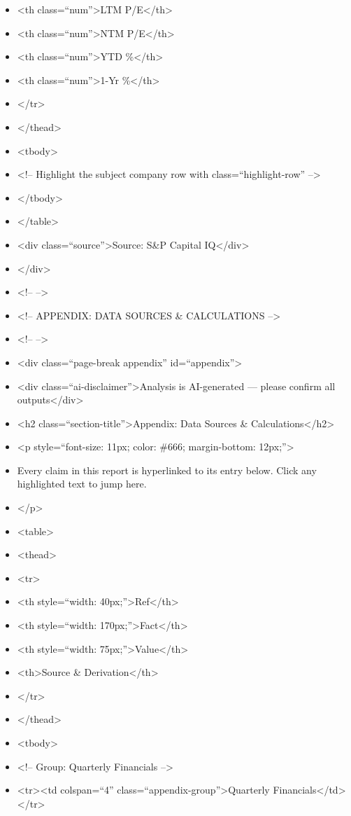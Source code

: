 \documentclass[11pt]{article}
\begin{document}
\begin{itemize}[leftmargin=*,itemsep=2pt,topsep=2pt]
\item {} <th class=``num''>LTM P/E</th>
\item {} <th class=``num''>NTM P/E</th>
\item {} <th class=``num''>YTD \%</th>
\item {} <th class=``num''>1-Yr \%</th>
\item {} </tr>
\item {} </thead>
\item {} <tbody>
\item {} <!-- Highlight the subject company row with class=``highlight-row'' -->
\item {} </tbody>
\item {} </table>
\item {} <div class=``source''>Source: S\&P Capital IQ</div>
\item {} </div>
\item {} <!-- -->
\item {} <!-- APPENDIX: DATA SOURCES \& CALCULATIONS -->
\item {} <!-- -->
\item {} <div class=``page-break appendix'' id=``appendix''>
\item {} <div class=``ai-disclaimer''>Analysis is AI-generated — please confirm all outputs</div>
\item {} <h2 class=``section-title''>Appendix: Data Sources \& Calculations</h2>
\item {} <p style=``font-size: 11px; color: \#666; margin-bottom: 12px;''>
\item {} Every claim in this report is hyperlinked to its entry below. Click any highlighted text to jump here.
\item {} </p>
\item {} <table>
\item {} <thead>
\item {} <tr>
\item {} <th style=``width: 40px;''>Ref</th>
\item {} <th style=``width: 170px;''>Fact</th>
\item {} <th style=``width: 75px;''>Value</th>
\item {} <th>Source \& Derivation</th>
\item {} </tr>
\item {} </thead>
\item {} <tbody>
\item {} <!-- Group: Quarterly Financials -->
\item {} <tr><td colspan=``4'' class=``appendix-group''>Quarterly Financials</td></tr>

\end{itemize}
\end{document}

